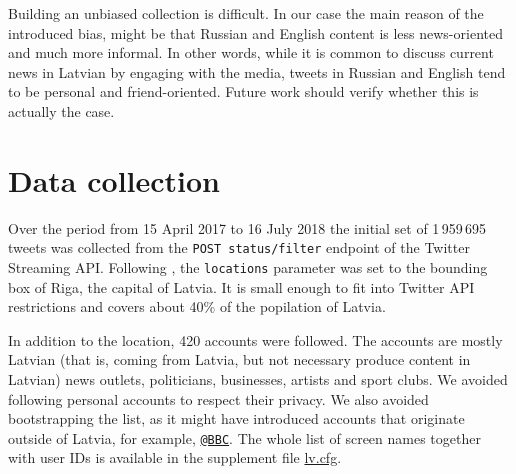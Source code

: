 \documentclass{IOS-Book-Article}
\makeatletter
\newcommand{\hl}[1]{#1}
\newcommand{\sn}[1]{\href{https://twitter.com/#1}{\texttt{@#1}}}
\newcommand{\zenodoBase}{https://zenodo.org/record/1313732}
\newcommand{\sfile}[1]{\href{\zenodoBase/files/#1}{#1}}
\makeatother
\begin{document}

Building an unbiased collection is difficult.  In our case the main reason of the introduced bias, might be that Russian and English content is less news-oriented and much more informal. In other words, while it is common to discuss current news in Latvian by engaging with the media, tweets in Russian and English tend to be personal and friend-oriented. Future work should verify whether this is actually the case.

\section{Data collection}
\label{sec:data-collection}



Over the period from 15 April 2017 to \hl{16 July 2018} the initial set of \hl{1\,959\,695} tweets was collected from the \texttt{POST status/filter} endpoint of the Twitter Streaming API. Following \cite{milajevs:2017:BUCC}, the \texttt{locations} parameter was set to the bounding box of Riga, the capital of Latvia. It is small enough to fit into Twitter API restrictions and covers about 40\% of the popilation of Latvia.\footnotemark{}
%

In addition to the location, 420 accounts were followed.\footnotemark{} The accounts are mostly Latvian (that is, coming from Latvia, but not necessary produce content in Latvian) news outlets, politicians, businesses, artists and sport clubs. We avoided following personal accounts to respect their privacy. We also avoided bootstrapping the list, as it might have introduced accounts that originate outside of Latvia, for example, \sn{BBC}. The whole list of screen names together with user IDs is available in the supplement file \sfile{lv.cfg}.

\end{document}
